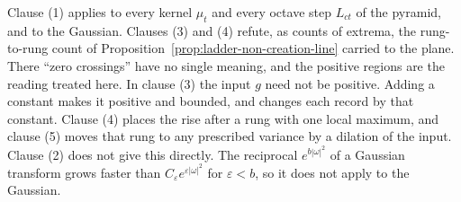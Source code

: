 Clause (1) applies to every kernel $\mu_t$ and every octave step $L_{ct}$ of the \Matern{}
pyramid, and to the Gaussian. Clauses (3) and (4) refute, as counts of extrema, the rung-to-rung
count of Proposition~\ref{prop:ladder-non-creation-line} carried to the plane. There ``zero
crossings'' have no single meaning, and the positive regions are the reading treated here. In
clause (3) the input $g$ need not be positive. Adding a constant makes it positive and bounded, and
changes each record by that constant.
Clause (4) places the rise after a rung with one local maximum, and clause (5) moves that rung to
any prescribed variance by a dilation of the input. Clause (2) does not give this directly. The
reciprocal $e^{b|\omega|^2}$ of a Gaussian transform grows faster than
$C_\varepsilon e^{\varepsilon|\omega|^2}$ for $\varepsilon < b$, so it does not apply to the
Gaussian.


